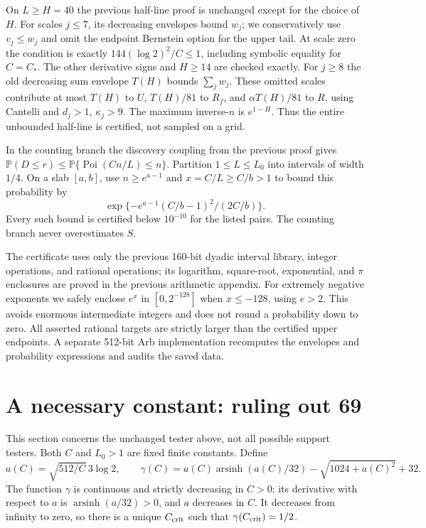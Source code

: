 \documentclass[10pt]{article}
\newcommand{\Prb}{\mathbb P}
\begin{document}
On $L\ge H=40$ the previous half-line proof is unchanged except for the
choice of $H$. For scales $j\le7$, its decreasing envelopes bound $w_j$;
we conservatively use $v_j\le w_j$ and omit the endpoint Bernstein option
for the upper tail. At scale zero the condition is exactly
$144(\log2)^2/C\le1$, including symbolic equality for $C=C_*$.
The other derivative signs and $H\ge14$ are checked exactly.
For $j\ge8$ the old decreasing sum envelope $T(H)$ bounds
$\sum_j w_j$. These omitted scales contribute at most $T(H)$ to $U$,
$T(H)/81$ to $R_f$, and $\alpha T(H)/81$ to $R$, using Cantelli and
$d_j>1$, $\kappa_j>9$. The maximum inverse-$n$ is $e^{1-H}$.
Thus the entire unbounded half-line is certified, not sampled on a grid.

In the counting branch the discovery coupling from the previous proof gives
$\Prb(D\le r)\le\Prb\{\operatorname{Poi}(Cn/L)\le n\}$.
Partition $1\le L\le L_0$ into intervals of width $1/4$. On a slab $[a,b]$,
use $n\ge e^{a-1}$ and $x=C/L\ge C/b>1$ to bound this probability by
\[
 \exp\{-e^{a-1}(C/b-1)^2/(2C/b)\}.
\]
Every such bound is certified below $10^{-10}$ for the listed pairs.
The counting branch never overestimates $S$.

The certificate uses only the previous 160-bit dyadic interval library,
integer operations, and rational operations; its logarithm, square-root,
exponential, and $\pi$ enclosures are proved in the previous arithmetic
appendix. For extremely negative exponents we safely enclose
$e^x$ in $[0,2^{-128}]$ when $x\le-128$, using $e>2$.
This avoids enormous intermediate integers and does not round a probability
down to zero. All asserted rational targets are strictly larger than the
certified upper endpoints. A separate 512-bit Arb implementation recomputes
the envelopes and probability expressions and audits the saved data.

\section{A necessary constant: ruling out 69}
This section concerns the unchanged tester above, not all possible support
testers. Both $C$ and $L_0>1$ are fixed finite constants.
Define
\[
 a(C)=\sqrt{512/C}\,3\log2,\qquad
 \gamma(C)=a(C)\operatorname{arsinh}(a(C)/32)
                -\sqrt{1024+a(C)^2}+32.
\]
The function $\gamma$ is continuous and strictly decreasing in $C>0$:
its derivative with respect to $a$ is $\operatorname{arsinh}(a/32)>0$,
and $a$ decreases in $C$. It decreases from infinity to zero, so there is
a unique $C_{\rm crit}$ such that $\gamma(C_{\rm crit})=1/2$.
\end{document}
